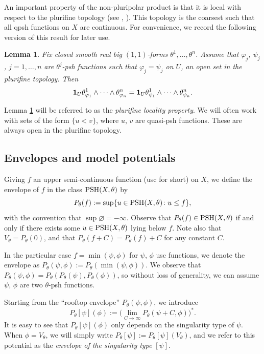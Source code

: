 \documentclass[pdftex]{sigma}
\numberwithin{equation}{section}
\newtheorem{Lemma}[Theorem]{Lemma}
\theoremstyle{plain}
\newcommand{\id}{{\bf 1}}
\begin{document}
An important property of the non-pluripolar product is that it is local with respect to the plurifine topology (see \cite[Corollary~4.3]{BT87}, \cite[Section~1.2]{BEGZ10}).
This topology is the coarsest such that all qpsh functions on $X$ are continuous. For convenience, we record the following version of this result for later use.

\begin{Lemma} \label{lem: plurifine}
Fix closed smooth real big $(1,1)$-forms $\theta^1,\dots,\theta^n$. Assume that $\varphi_j$, $\psi_j$, $j=1,\dots,n$ are $\theta^j$-psh functions such that $\varphi_j =\psi_j$ on $U$, an open set in the plurifine topology. Then
\[
\id_{U} \theta^1_{\varphi_1} \wedge \dots \wedge \theta^n_{\varphi_n} = \id_{U} \theta^1_{\psi_1} \wedge\dots \wedge \theta^n_{\psi_n}.
\]
\end{Lemma}
Lemma \ref{lem: plurifine} will be referred to as the \emph{plurifine locality property}. We will often work with sets of the form $\{u<v\}$, where $u$, $v$ are quasi-psh functions. These are always open in the plurifine topology.

\subsection{Envelopes and model potentials}
Giving $f$ an upper semi-continuous function (usc for short) on $X$, we define the envelope of $f$ in the class ${\rm PSH}(X,\theta)$ by
\[
P_{\theta}(f) := \sup \{u\in {\rm PSH}(X,\theta) \colon u\leq f\},
\]
with the convention that $\sup\varnothing =-\infty$. Observe that $P_{\theta}(f)\in {\rm PSH}(X,\theta)$ if and only if there exists some $u\in {\rm PSH}(X,\theta)$ lying below $f$. Note also that $V_{\theta}=P_{\theta}(0)$, and that $P_{\theta}(f+C)= P_{\theta}(f)+C$ for any constant $C$.

 In the particular case $f=\min(\psi,\phi)$ for $\psi$, $\phi$ usc functions, we denote the envelope as
$ P_\theta(\psi,\phi):=P_\theta(\min(\psi,\phi))$.
We observe that $ P_\theta(\psi,\phi)= P_\theta(P_\theta(\psi),P_\theta(\phi))$, so without loss of generality, we can assume $\psi$, $\phi$ are two $\theta$-psh functions.

Starting from the ``rooftop envelope'' $ P_\theta(\psi,\phi)$, we introduce
\[P_\theta[\psi](\phi) := \big(\lim_{C \to \infty}P_\theta(\psi+C,\phi)\big)^*.\]
It is easy to see that $P_\theta[\psi](\phi)$ only depends on the singularity type of $\psi$. When $\phi = V_\theta$, we will simply write $P_\theta[\psi]:=P_\theta[\psi](V_\theta)$, and we refer to this potential as the \emph{envelope of the singularity type} $[\psi]$.
\end{document}

